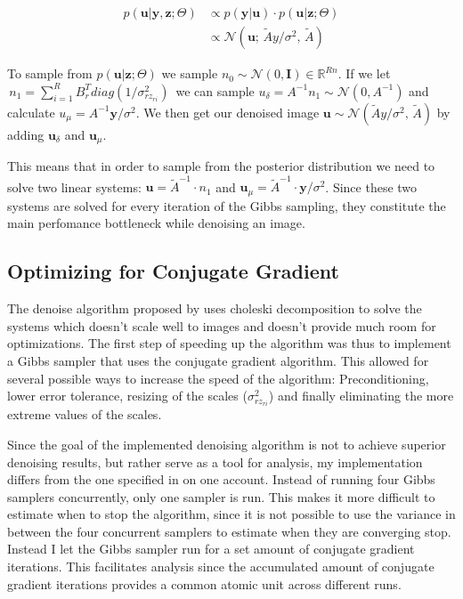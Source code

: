 \documentclass{article}
\begin{document}
\begin{align}
	p(\textbf{u}| \textbf{y}, \textbf{z}; \Theta) & \propto 
	p(\textbf{y}|\textbf{u}) \cdot p(\textbf{u}|\textbf{z};\Theta) \\
	& \propto \mathcal{N} \left( \textbf{u} ; \, \tilde{A} y / \sigma^2, 
	\, \tilde{A}\right)
\end{align}

To sample from $p(\textbf{u}|\textbf{z};\Theta)$ we sample $n_0 \sim 
\mathcal{N}(0, \textbf{I}) \in \mathbb{R}^{Rn}$. If we let $\,n_1 = 
\sum_{i=1}^{R} B_r^T diag(1/\sigma^2_{rz_{ri}})\,$ we can sample 
$u_{\delta} = A^{-1} n_1 \sim \mathcal{N}(0, A^{-1})$ and calculate 
$u_{\mu} = A^{-1} \textbf{y}/\sigma^2$. We then get our denoised image 
$\textbf{u} \sim \mathcal{N} \left(\tilde{A} y / \sigma^2, \, 
\tilde{A}\right)$ by adding $\textbf{u}_{\delta}$ and 
$\textbf{u}_{\mu}$.

This means that in order to sample from the posterior distribution we 
need to solve two linear systems: $\textbf{u} = \tilde{A}^{-1} \cdot 
n_1$ and $\textbf{u}_{\mu} = \tilde{A}^{-1} \cdot \textbf{y}/\sigma^2$.  
Since these two systems are solved for every iteration of the Gibbs 
sampling, they constitute the main perfomance bottleneck while denoising 
an image.  

\subsection{Optimizing for Conjugate Gradient}

The denoise algorithm proposed by \citep{uwe} uses choleski 
decomposition to solve the systems which doesn't scale well to images 
and doesn't provide much room for optimizations. The first step of 
speeding up the algorithm was thus to implement a Gibbs sampler that 
uses the conjugate gradient algorithm. This allowed for several possible 
ways to increase the speed of the algorithm: Preconditioning, lower 
error tolerance, resizing of the scales ($\sigma^2_{rz_{ri}}$) and 
finally eliminating the more extreme values of the scales.

Since the goal of the implemented denoising algorithm is not to achieve 
superior denoising results, but rather serve as a tool for analysis, my 
implementation differs from the one specified in \citep{uwe} on one 
account.  Instead of running four Gibbs samplers concurrently, only one 
sampler is run.  This makes it more difficult to estimate when to stop 
the algorithm, since it is not possible to use the variance in between 
the four concurrent samplers to estimate when they are converging stop.  
Instead I let the Gibbs sampler run for a set amount of conjugate 
gradient iterations.  This facilitates analysis since the accumulated 
amount of conjugate gradient iterations provides a common atomic unit 
across different runs.
\end{document}
